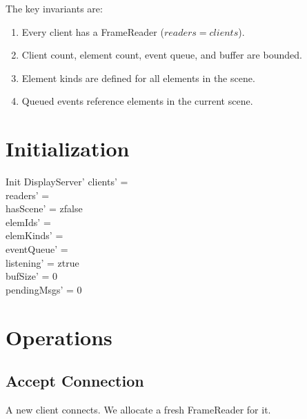 \documentclass[a4paper,10pt,fleqn]{article}
\begin{document}
The key invariants are:
\begin{enumerate}
  \item Every client has a FrameReader ($readers = clients$).
  \item Client count, element count, event queue, and buffer are bounded.
  \item Element kinds are defined for all elements in the scene.
  \item Queued events reference elements in the current scene.
\end{enumerate}

\section{Initialization}

\begin{schema}{Init}
  DisplayServer'
  \where
  clients' = \emptyset \\
  readers' = \emptyset \\
  hasScene' = zfalse \\
  elemIds' = \emptyset \\
  elemKinds' = \emptyset \\
  eventQueue' = \emptyset \\
  listening' = ztrue \\
  bufSize' = 0 \\
  pendingMsgs' = 0
\end{schema}

\section{Operations}

\subsection{Accept Connection}

A new client connects.  We allocate a fresh FrameReader for it.
\end{document}
